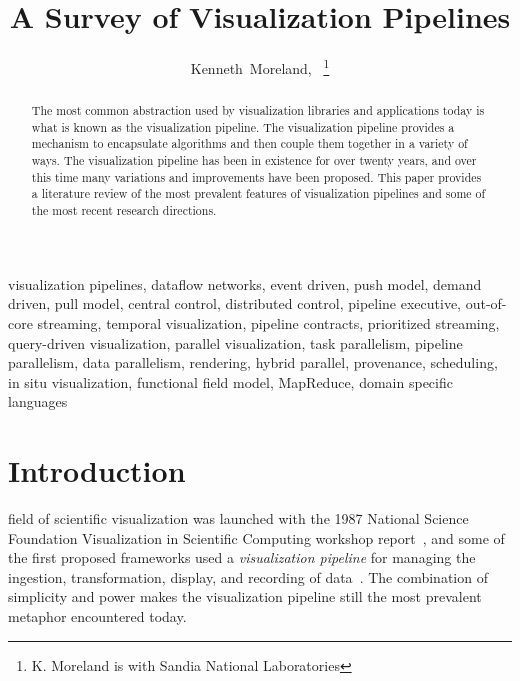 \documentclass[journal,twocolumn,10pt,letterpaper,twoside]{IEEEtran}
\title{A Survey of Visualization Pipelines}
\author{Kenneth~Moreland,~\IEEEmembership{Member,~IEEE}%
%
\thanks{K. Moreland is with Sandia National Laboratories}
}
\date{}
\newcommand*{\lcite}[1]{~\cite{#1}}
\newcommand*{\keyterm}[1]{\emph{#1}}
\begin{document}
\maketitle


\begin{abstract}
The most common abstraction used by visualization libraries and
applications today is what is known as the visualization pipeline.  The
visualization pipeline provides a mechanism to encapsulate algorithms and
then couple them together in a variety of ways.  The visualization pipeline
has been in existence for over twenty years, and over this time many
variations and improvements have been proposed.  This paper provides a
literature review of the most prevalent features of visualization pipelines
and some of the most recent research directions.
\end{abstract}

\begin{IEEEkeywords}
  visualization pipelines, dataflow networks, event driven, push model,
  demand driven, pull model, central control, distributed control, pipeline
  executive, out-of-core streaming, temporal visualization, pipeline
  contracts, prioritized streaming, query-driven visualization, parallel
  visualization, task parallelism, pipeline parallelism, data parallelism,
  rendering, hybrid parallel, provenance, scheduling, in situ
  visualization, functional field model, MapReduce, domain specific
  languages
\end{IEEEkeywords}


\section{Introduction}
\label{sec:Introduction}

 field of scientific visualization was launched with the 1987 National
Science Foundation Visualization in Scientific Computing workshop
report\lcite{ViSC1987}, and some of the first proposed frameworks used a
\keyterm{visualization pipeline} for managing the ingestion,
transformation, display, and recording of
data\lcite{Haeberli1988,Lucas1992}.  The combination of simplicity and
power makes the visualization pipeline still the most prevalent metaphor
encountered today.
\end{document}
